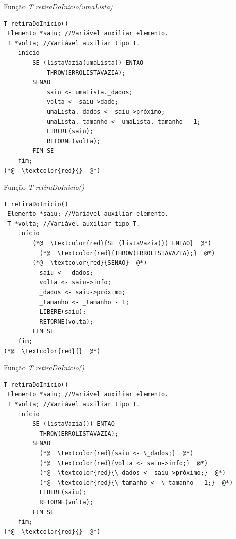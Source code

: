 \documentclass[12pt,table,xcolor={dvipsnames}]{beamer}
\begin{document}
\begin{frame}[fragile]{Função \textit{T retiraDoInicio(umaLista)}}
\begin{lstlisting}
T retiraDoInicio()
 Elemento *saiu; //Variável auxiliar elemento.
 T *volta; //Variável auxiliar tipo T.
    início
        SE (listaVazia(umaLista)) ENTAO
            THROW(ERROLISTAVAZIA);
        SENAO
            saiu <- umaLista._dados;
            volta <- saiu->dado;
            umaLista._dados <- saiu->próximo;
            umaLista._tamanho <- umaLista._tamanho - 1;
            LIBERE(saiu);
            RETORNE(volta);
        FIM SE
    fim;
(*@  \textcolor{red}{}  @*)
\end{lstlisting}
\end{frame}

\begin{frame}[fragile]{Função \textit{T retiraDoInicio()}}
\begin{lstlisting}
T retiraDoInicio()
 Elemento *saiu; //Variável auxiliar elemento.
 T *volta; //Variável auxiliar tipo T.
	início
		(*@  \textcolor{red}{SE (listaVazia()) ENTAO}  @*)
		  (*@  \textcolor{red}{THROW(ERROLISTAVAZIA);}  @*)
		(*@  \textcolor{red}{SENAO}  @*)
		  saiu <- _dados;
		  volta <- saiu->info;
		  _dados <- saiu->próximo;
		  _tamanho <- _tamanho - 1;
		  LIBERE(saiu);
		  RETORNE(volta);
		FIM SE
	fim;
(*@  \textcolor{red}{}  @*)
\end{lstlisting}
\end{frame}

\begin{frame}[fragile]{Função \textit{T retiraDoInicio()}}
\begin{lstlisting}
T retiraDoInicio()
 Elemento *saiu; //Variável auxiliar elemento.
 T *volta; //Variável auxiliar tipo T.
	início
		SE (listaVazia()) ENTAO
		  THROW(ERROLISTAVAZIA);
		SENAO
		  (*@  \textcolor{red}{saiu <- \_dados;}  @*)
		  (*@  \textcolor{red}{volta <- saiu->info;}  @*)
		  (*@  \textcolor{red}{\_dados <- saiu->próximo;}  @*)
		  (*@  \textcolor{red}{\_tamanho <- \_tamanho - 1;}  @*)
		  LIBERE(saiu);
		  RETORNE(volta);
		FIM SE
	fim;
(*@  \textcolor{red}{}  @*)
\end{lstlisting}
\end{frame}
\end{document}

